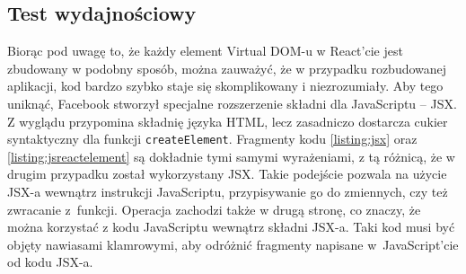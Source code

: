 \subsection{Test wydajnościowy}
Biorąc pod uwagę to, że każdy element Virtual DOM-u w React'cie jest zbudowany w podobny sposób, można zauważyć, że w przypadku rozbudowanej aplikacji, kod bardzo szybko staje się skomplikowany i niezrozumiały. Aby tego uniknąć, Facebook stworzył specjalne rozszerzenie składni dla JavaScriptu -- JSX. Z wyglądu przypomina składnię języka HTML, lecz zasadniczo dostarcza cukier syntaktyczny dla funkcji \lstinline[style=JavaScript]{createElement}. Fragmenty kodu \ref{listing:jsx} oraz \ref{listing:jsreactelement} są dokładnie tymi samymi wyrażeniami, z tą różnicą, że w drugim przypadku został wykorzystany JSX. Takie podejście pozwala na użycie JSX-a wewnątrz instrukcji JavaScriptu, przypisywanie go do zmiennych, czy też zwracanie z~funkcji. Operacja zachodzi także w drugą stronę, co znaczy, że można korzystać z kodu JavaScriptu wewnątrz składni JSX-a. Taki kod musi być objęty nawiasami klamrowymi, aby odróżnić fragmenty napisane w~JavaScript'cie od kodu JSX-a. 

